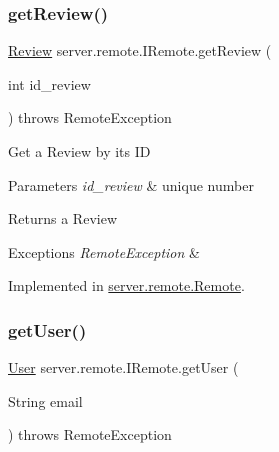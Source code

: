 \mbox{\label{interfaceserver_1_1remote_1_1_i_remote_a7b3462a438579c85dc7f097acf9cec41}} 
\subsubsection{\texorpdfstring{get\+Review()}{getReview()}}
{\footnotesize\ttfamily \hyperlink{classserver_1_1data_1_1_review}{Review} server.\+remote.\+I\+Remote.\+get\+Review (\begin{DoxyParamCaption}\item[{int}]{id\+\_\+review }\end{DoxyParamCaption}) throws Remote\+Exception}

Get a Review by its ID 
\begin{DoxyParams}{Parameters}
{\em id\+\_\+review} & unique number \\
\hline
\end{DoxyParams}
\begin{DoxyReturn}{Returns}
a Review 
\end{DoxyReturn}

\begin{DoxyExceptions}{Exceptions}
{\em Remote\+Exception} & \\
\hline
\end{DoxyExceptions}


Implemented in \hyperlink{classserver_1_1remote_1_1_remote_a98bd7181568c637a6cbcc0b72ebb9f95}{server.\+remote.\+Remote}.

\mbox{\label{interfaceserver_1_1remote_1_1_i_remote_ab741cf58a7e2b18ba36069d14d9d04ef}} 
\subsubsection{\texorpdfstring{get\+User()}{getUser()}}
{\footnotesize\ttfamily \hyperlink{classserver_1_1data_1_1_user}{User} server.\+remote.\+I\+Remote.\+get\+User (\begin{DoxyParamCaption}\item[{String}]{email }\end{DoxyParamCaption}) throws Remote\+Exception}

